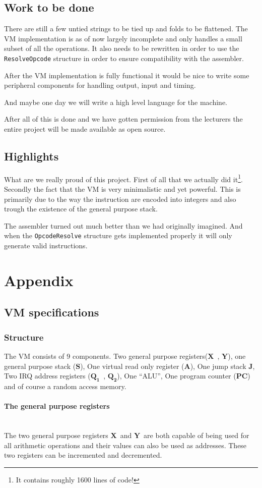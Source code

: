 \documentclass{article}
\newcommand{\V}{\verb}
\newcommand{\x}{$\textbf{X}$}
\newcommand{\y}{$\textbf{Y}$}
\newcommand{\s}{$\textbf{S}$}
\newcommand{\A}{$\textbf{A}$}
\newcommand{\q}{$\textbf{Q}_{\textbf{1}}$}
\newcommand{\qq}{$\textbf{Q}_{\textbf{2}}$}
\newcommand{\pc}{$\textbf{PC}$}
\newcommand{\J}{$\textbf{J}$}
\begin{document}
\subsection{Work to be done}
There are still a few untied strings to be tied up and folds to be flattened.
The VM implementation is as of now largely incomplete and only handles a small subset
of all the operations. It also needs to be rewritten in order to use the
\V+ResolveOpcode+ structure in order to ensure compatibility with the assembler.

After the VM implementation is fully functional it would be nice to write some
peripheral components for handling output, input and timing.

And maybe one day we will write a high level language for the machine.

After all of this is done and we have gotten permission from the lecturers the
entire project will be made available as open source.
\subsection{Highlights}
What are we really proud of this project. First of all that we actually
did it\footnote{It contains roughly 1600 lines of code!}. Secondly the fact that
the VM is very minimalistic and yet powerful.
This is primarily due to the way the instruction are encoded into integers and
also trough the existence of the general purpose stack.

The assembler turned out much better than we had originally imagined. And when
the \V+OpcodeResolve+ structure gets implemented properly it will only generate
valid instructions.
\section{Appendix}
\subsection{VM specifications}
\subsubsection{Structure}
The VM consists of 9 components. Two general purpose registers(\x \ , \y ), one
general purpose stack (\s), One virtual read only register (\A), One jump stack
\J, Two IRQ address registers (\q \ , \qq), One ``ALU'', One program counter
(\pc) and of course a random access memory.

\paragraph{The general purpose registers} \
\\
The two general purpose registers \x \ and \y \ are both capable of being used
for all arithmetic operations and their values can also be used as addresses.
These two registers can be incremented and decremented.
\end{document}
